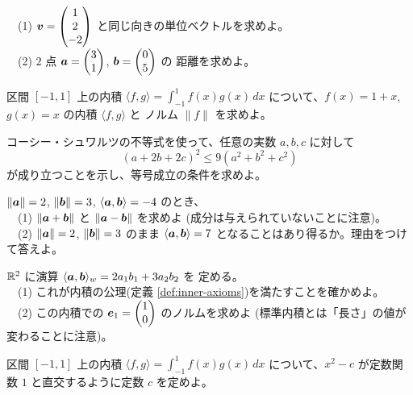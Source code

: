 \begin{mondai}[基本]\label{q:inner-ex3}
　(1) $\bm{v} = \begin{pmatrix}1 \\ 2 \\ -2\end{pmatrix}$ と同じ向きの単位ベクトルを求めよ。\\
　(2) $2$ 点 $\bm{a} = \begin{pmatrix}3 \\ 1\end{pmatrix}$, $\bm{b} = \begin{pmatrix}0 \\ 5\end{pmatrix}$ の
距離を求めよ。
\end{mondai}

\begin{mondai}[基本]\label{q:inner-ex4}
区間 $[-1, 1]$ 上の内積 $\langle f, g \rangle = \int_{-1}^{1} f(x)g(x)\,dx$
について、$f(x) = 1 + x$, $g(x) = x$ の内積 $\langle f, g \rangle$ と
ノルム $\|f\|$ を求めよ。
\end{mondai}

\begin{mondai}[標準]\label{q:inner-ex5}
コーシー・シュワルツの不等式を使って、任意の実数 $a, b, c$ に対して
\[
(a + 2b + 2c)^2 \le 9(a^2 + b^2 + c^2)
\]
が成り立つことを示し、等号成立の条件を求めよ。
\end{mondai}

\begin{mondai}[標準]\label{q:inner-ex6}
$\|\bm{a}\| = 2$, $\|\bm{b}\| = 3$,
$\langle \bm{a}, \bm{b} \rangle = -4$ のとき、\\
　(1) $\|\bm{a} + \bm{b}\|$ と $\|\bm{a} - \bm{b}\|$ を求めよ
(成分は与えられていないことに注意)。\\
　(2) $\|\bm{a}\| = 2$, $\|\bm{b}\| = 3$ のまま
$\langle \bm{a}, \bm{b} \rangle = 7$ となることはあり得るか。理由をつけて答えよ。
\end{mondai}

\begin{mondai}[標準]\label{q:inner-ex7}
$\mathbb{R}^2$ に演算 $\langle \bm{a}, \bm{b} \rangle_w = 2a_1b_1 + 3a_2b_2$ を
定める。\\
　(1) これが内積の公理(定義 \ref{def:inner-axioms})を満たすことを確かめよ。\\
　(2) この内積での $\bm{e}_1 = \begin{pmatrix}1 \\ 0\end{pmatrix}$ のノルムを求めよ
(標準内積とは「長さ」の値が変わることに注意)。
\end{mondai}

\begin{mondai}[標準]\label{q:inner-ex8}
区間 $[-1, 1]$ 上の内積 $\langle f, g \rangle = \int_{-1}^{1} f(x)g(x)\,dx$
について、$x^2 - c$ が定数関数 $1$ と直交するように定数 $c$ を定めよ。
\end{mondai}

